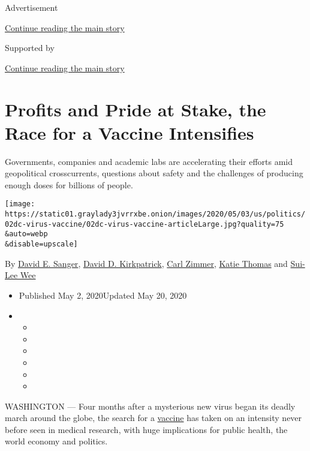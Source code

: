 Advertisement

\protect\hyperlink{after-top}{Continue reading the main story}

Supported by

\protect\hyperlink{after-sponsor}{Continue reading the main story}

\hypertarget{profits-and-pride-at-stake-the-race-for-a-vaccine-intensifies}{%
\section{Profits and Pride at Stake, the Race for a Vaccine
Intensifies}\label{profits-and-pride-at-stake-the-race-for-a-vaccine-intensifies}}

Governments, companies and academic labs are accelerating their efforts
amid geopolitical crosscurrents, questions about safety and the
challenges of producing enough doses for billions of people.

\texttt{[image: https://static01.graylady3jvrrxbe.onion/images/2020/05/03/us/politics/02dc-virus-vaccine/02dc-virus-vaccine-articleLarge.jpg?quality=75\\\&auto=webp\\\&disable=upscale]}

By \href{https://www.nytimes3xbfgragh.onion/by/david-e-sanger}{David E.
Sanger},
\href{https://www.nytimes3xbfgragh.onion/by/david-d-kirkpatrick}{David
D. Kirkpatrick},
\href{https://www.nytimes3xbfgragh.onion/by/carl-zimmer}{Carl Zimmer},
\href{https://www.nytimes3xbfgragh.onion/by/katie-thomas}{Katie Thomas}
and \href{https://www.nytimes3xbfgragh.onion/by/sui-lee-wee}{Sui-Lee
Wee}

\begin{itemize}
\item
  Published May 2, 2020Updated May 20, 2020
\item
  \begin{itemize}
  \item
  \item
  \item
  \item
  \item
  \item
  \end{itemize}
\end{itemize}

WASHINGTON --- Four months after a mysterious new virus began its deadly
march around the globe, the search for a
\href{https://www.nytimes3xbfgragh.onion/2020/05/20/health/coronavirus-vaccines.html}{vaccine}
has taken on an intensity never before seen in medical research, with
huge implications for public health, the world economy and politics.

